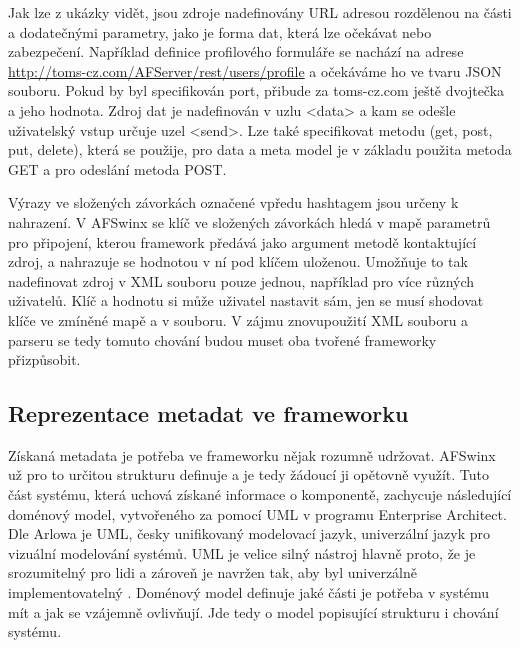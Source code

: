 Jak lze z ukázky vidět, jsou zdroje nadefinovány URL adresou rozdělenou na části a dodatečnými parametry, jako je forma dat, která lze očekávat nebo zabezpečení. Například definice profilového formuláře se nachází na adrese \url{http://toms-cz.com/AFServer/rest/users/profile} a očekáváme ho ve tvaru JSON souboru. Pokud by byl specifikován port, přibude za toms-cz.com ještě dvojtečka a jeho hodnota. Zdroj dat je nadefinován v uzlu <data> a kam se odešle uživatelský vstup určuje uzel <send>. Lze také specifikovat metodu (get, post, put, delete), která se použije, pro data a meta model je v základu použita metoda GET a pro odeslání metoda POST.

Výrazy ve složených závorkách označené vpředu hashtagem jsou určeny k nahrazení. V AFSwinx \cite{tomasek-thesis} se klíč ve složených závorkách hledá v mapě parametrů pro připojení, kterou framework předává jako argument metodě kontaktující zdroj, a nahrazuje se hodnotou v ní pod klíčem uloženou. Umožňuje to tak nadefinovat zdroj v XML souboru pouze jednou, například pro více různých uživatelů. Klíč a hodnotu si může uživatel nastavit sám, jen se musí shodovat klíče ve zmíněné mapě a v souboru. V zájmu znovupoužití XML souboru a parseru se tedy tomuto chování budou muset oba tvořené frameworky přizpůsobit.

\subsection{Reprezentace metadat ve frameworku}
Získaná metadata je potřeba ve frameworku nějak rozumně udržovat. AFSwinx už pro to určitou strukturu definuje \cite{tomasek-thesis} a je tedy žádoucí ji opětovně využít. Tuto část systému, která uchová získané informace o komponentě, zachycuje následující doménový model, vytvořeného za pomocí UML v programu Enterprise Architect. Dle Arlowa je UML, česky unifikovaný modelovací jazyk, univerzální jazyk pro vizuální modelování systémů. UML je velice silný nástroj hlavně proto, že je srozumitelný pro lidi a zároveň je navržen tak, aby byl univerzálně implementovatelný \cite{UmlArlow}. Doménový model definuje jaké části je potřeba v systému mít a jak se vzájemně ovlivňují. Jde tedy o model popisující strukturu i chování systému.


